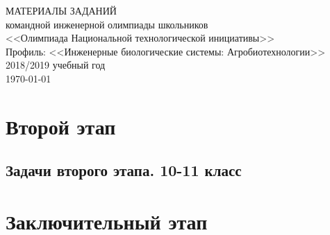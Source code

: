 \documentclass[a4paper,12pt,oneside]{book}
\begin{document}
\begin{titlepage}
    \begin{center}
        \huge{МАТЕРИАЛЫ ЗАДАНИЙ} \\
        \Large{командной инженерной олимпиады школьников} \\
        \Large{<<Олимпиада Национальной технологической инициативы>>} \\
        \Large{Профиль: <<Инженерные биологические системы: Агробиотехнологии>>} \\
        \large{2018/2019 учебный год} \\
        \vspace{2cm}
        \Large{\today}  
    \end{center}
\end{titlepage}

\setcounter{tocdepth}{1}

\tableofcontents


%
%

\part{Второй этап}
\clearpage

%

\chapter{Задачи второго этапа. 10-11 класс}



\part{Заключительный этап}

\clearpage
\end{document}
